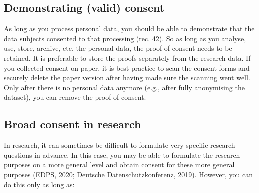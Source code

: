 \documentclass[
]{book}
\begin{document}
\hypertarget{demonstrate-consent}{%
\subsection{Demonstrating (valid) consent}\label{demonstrate-consent}}

As long as you process personal data, you should be able to demonstrate that the
data subjects consented to that processing
(\href{https://gdpr-info.eu/recitals/no-42/}{rec. 42}).
So as long as you analyse, use, store, archive, etc. the personal data, the
proof of consent needs to be retained. It is preferable to store the proofs
separately from the research data. If you collected consent on paper, it is
best practice to scan the consent forms and securely delete the paper version
after having made sure the scanning went well. Only after there is no personal
data anymore (e.g., after fully anonymising the dataset), you can remove the
proof of consent.

\hypertarget{broad-consent}{%
\subsection{Broad consent in research}\label{broad-consent}}

In research, it can sometimes be difficult to formulate very specific research
questions in advance. In this case, you may be able to formulate the research
purposes on a more general level and obtain consent for these more general
purposes
(\href{https://edps.europa.eu/sites/default/files/publication/20-01-06_opinion_research_en.pdf}{EDPS, 2020};
\href{https://www.datenschutzkonferenz-online.de/media/dskb/20190405_auslegung_bestimmte_bereiche_wiss_forschung.pdf}{Deutsche Datenschutzkonferenz, 2019}).
However, you can do this only as long as:
\end{document}
